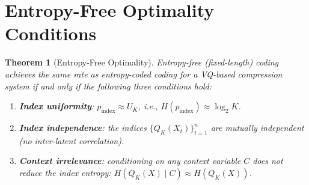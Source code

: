\documentclass[11pt,a4paper]{article}
\newtheorem{theorem}{Theorem}[section]
\theoremstyle{definition}
\theoremstyle{remark}
\begin{document}
\section{Entropy-Free Optimality Conditions}

\begin{theorem}[Entropy-Free Optimality]
\label{thm:optimality}
Entropy-free (fixed-length) coding achieves the same rate as entropy-coded
coding for a VQ-based compression system if and only if the following three
conditions hold:
\begin{enumerate}[label=(\alph*)]
  \item \textbf{Index uniformity}: $p_{\mathrm{index}} \approx U_K$,
        i.e., $H(p_{\mathrm{index}}) \approx \log_2 K$.
  \item \textbf{Index independence}: the indices $\{Q_K(X_t)\}_{t=1}^{n}$
        are mutually independent (no inter-latent correlation).
  \item \textbf{Context irrelevance}: conditioning on any context variable
        $C$ does not reduce the index entropy:
        $H(Q_K(X) \mid C) \approx H(Q_K(X))$.
\end{enumerate}
\end{theorem}
\end{document}
